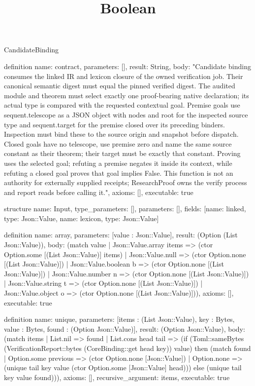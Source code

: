 \begin{lexlean}{CandidateBinding}
\title{Boolean}
\begin{semanticmodule}

definition{
 name: contract,
 parameters: [],
 result: String,
 body: "Candidate binding consumes the linked IR and lexicon closure of the owned verification job. Their canonical semantic digest must equal the pinned verified digest. The audited module and theorem must select exactly one proof-bearing native declaration; its actual type is compared with the requested contextual goal. Premise goals use sequent.telescope as a JSON object with nodes and root for the inspected source type and sequent.target for the premise closed over its preceding binders. Inspection must bind these to the source origin and snapshot before dispatch. Closed goals have no telescope, use premise zero and name the same source constant as their theorem; their target must be exactly that constant. Proving uses the selected goal; refuting a premise negates it inside its context, while refuting a closed goal proves that goal implies False. This function is not an authority for externally supplied receipts; ResearchProof owns the verify process and report reads before calling it.",
 axioms: [],
 executable: true
}

structure{
 name: Input,
 type_parameters: [],
 parameters: [],
 fields: [{name: linked, type: Json::Value}, {name: lexicon, type: Json::Value}]
}

definition{
 name: array,
 parameters: [value : Json::Value],
 result: (Option (List Json::Value)),
 body: (match value | Json::Value.array items => (ctor Option.some [(List Json::Value)] items) | Json::Value.null => (ctor Option.none [(List Json::Value)]) | Json::Value.boolean b => (ctor Option.none [(List Json::Value)]) | Json::Value.number n => (ctor Option.none [(List Json::Value)]) | Json::Value.string t => (ctor Option.none [(List Json::Value)]) | Json::Value.object o => (ctor Option.none [(List Json::Value)])),
 axioms: [],
 executable: true
}

definition{
 name: unique,
 parameters: [items : (List Json::Value), key : Bytes, value : Bytes, found : (Option Json::Value)],
 result: (Option Json::Value),
 body: (match items | List.nil => found | List.cons head tail => (if (Toml::sameBytes (VerificationReport::bytes (CoreBinding::get head key)) value) then (match found | Option.some previous => (ctor Option.none [Json::Value]) | Option.none => (unique tail key value (ctor Option.some [Json::Value] head))) else (unique tail key value found))),
 axioms: [],
 recursive_argument: items,
 executable: true
}


\end{semanticmodule}
\end{lexlean}
